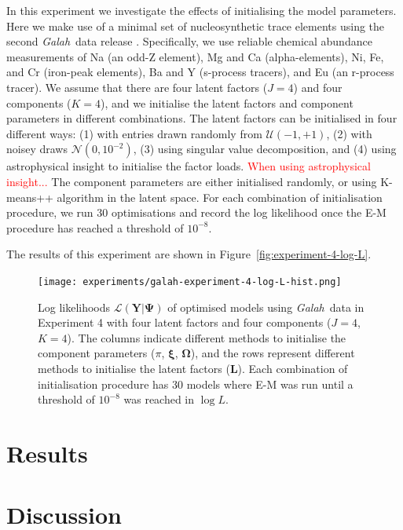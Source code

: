\documentclass[twocolumn]{aastex61}
\newcommand{\project}[1]{\textsl{#1}}
\newcommand{\Galah}{\project{Galah}}
\newcommand{\todo}[1]{\textcolor{red}{#1}}
\newcommand{\vect}[1]{\boldsymbol{\mathbf{#1}}}
\renewcommand{\vec}[1]{\vect{#1}}
\newcommand{\data}{\textbf{Y}}
\newcommand{\factorloads}{\textbf{L}}
\newcommand{\scoremeans}{\vec\xi}
\newcommand{\scorecovs}{\vec\Omega}
\begin{document}
In this experiment we investigate the effects of initialising the model parameters.
Here we make use of a minimal set of nucleosynthetic trace elements
using the second \Galah\ data release \citep{Buder:2018}. Specifically, we use
reliable chemical abundance measurements of Na (an odd-Z element), Mg and Ca (alpha-elements),
Ni, Fe, and Cr (iron-peak elements), Ba and Y (s-process tracers), and Eu (an r-process tracer).
We assume that there are four latent factors ($J = 4$) and four components ($K = 4$),
and we initialise the latent factors and component parameters in different combinations.
The latent factors can be initialised in four different ways: (1) with entries drawn randomly from $\mathcal{U}\left(-1, +1\right)$, (2) with noisey draws $\mathcal{N}\left(0, 10^{-2}\right)$, (3) using singular value decomposition, and (4) using astrophysical insight to initialise the factor loads. 
\todo{When using astrophysical insight...}
The component parameters are either initialised randomly, or using K-means++ algorithm in
the latent space. For each combination of initialisation procedure, we run 30 optimisations
and record the log likelihood once the E-M procedure has reached a threshold of $10^{-8}$.

The results of this experiment are shown in Figure~\ref{fig:experiment-4-log-L}.

\begin{figure}
	\texttt{[image: experiments/galah-experiment-4-log-L-hist.png]}
	\caption{Log likelihoods $\mathcal{L}\left(\data|\vec\Psi\right)$ of optimised
			 models using \Galah\ data in Experiment 4 with four latent factors
			 and four components ($J = 4$, $K = 4$). The columns indicate different
			 methods to initialise the component parameters ($\pi$, $\scoremeans$,
			 $\scorecovs$), and the rows represent different methods to initialise
			 the latent factors ($\factorloads$). Each combination of initialisation
			 procedure has 30 models where E-M was run until a threshold of $10^{-8}$
			 was reached in $\log{L}$.}
	\label{fig:galah-experiment-4-log-L}
\end{figure}






\section{Results} \label{sec:results}

\section{Discussion} \label{sec:discussion}
\end{document}
